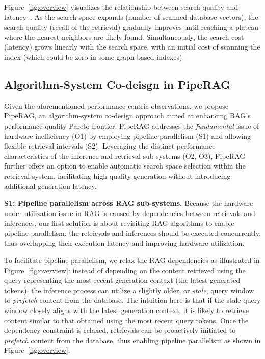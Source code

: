 Figure~\ref{fig:overview} visualizes the relationship between search quality and latency~\cite{PQ}. As the search space expands (number of scanned database vectors), the search quality (recall of the retrieval) gradually improves until reaching a plateau where the nearest neighbors are likely found. Simultaneously, the search cost (latency) grows linearly with the search space, with an initial cost of scanning the index (which could be zero in some graph-based indexes). 

\subsection{Algorithm-System Co-deisgn in PipeRAG}

Given the aforementioned performance-centric observations, we propose PipeRAG, an algorithm-system co-design approach aimed at enhancing RAG's performance-quality Pareto frontier. 
PipeRAG addresses the \textit{fundamental} issue of hardware inefficiency (O1) by employing pipeline parallelism (S1) and allowing flexible retrieval intervals (S2). Leveraging the distinct performance characteristics of the inference and retrieval sub-systems (O2, O3), PipeRAG further offers an option to enable automatic search space selection within the retrieval system, facilitating high-quality generation without introducing additional generation latency.

\textbf{S1: Pipeline parallelism across RAG sub-systems.} 
Because the hardware under-utilization issue in RAG is caused by dependencies between retrievals and inferences, our first solution is about revisiting RAG algorithms to enable pipeline parallelism: the retrievals and inferences should be executed concurrently, thus overlapping their execution latency and improving hardware utilization. 

To facilitate pipeline parallelism, we relax the RAG dependencies as illustrated in Figure~\ref{fig:overview}: instead of depending on the content retrieved using the query representing the most recent generation context (the latest generated tokens),
the inference process can utilize a slightly older, or \textit{stale}, query window to \textit{prefetch} content from the database.
The intuition here is that if the stale query window closely aligns with the latest generation context, it is likely to retrieve content similar to that obtained using the most recent query tokens.
Once the dependency constraint is relaxed, retrievals can be proactively initiated to \textit{prefetch} content from the database, thus enabling pipeline parallelism as shown in Figure~\ref{fig:overview}.

